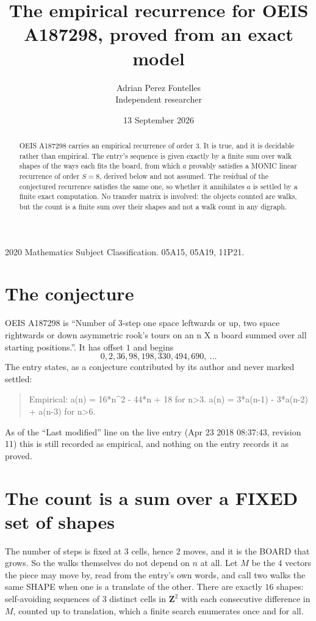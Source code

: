 \documentclass[11pt,a4paper]{article}
\title{The empirical recurrence for OEIS A187298, proved from an exact model}
\author{Adrian Perez Fontelles\\ \small Independent researcher}
\date{13 September 2026}
\theoremstyle{plain}
\theoremstyle{definition}
\begin{document}
\maketitle

\begin{abstract}
OEIS A187298 carries an empirical recurrence of order $3$. It is true, and it is
decidable rather than empirical. The entry's sequence is given exactly by a finite sum over walk shapes of the ways each fits the board, from
which $a$ provably satisfies a MONIC linear recurrence of order $S=8$, derived below and not
assumed. The residual of the conjectured recurrence satisfies the same one, so whether it
annihilates $a$ is settled by a finite exact computation. No transfer matrix is involved: the objects counted are walks, but the count is a finite sum over their shapes and not a walk count in any digraph.
\end{abstract}

\noindent\small 2020 Mathematics Subject Classification. 05A15, 05A19, 11P21.\normalsize

\section{The conjecture}

OEIS A187298 is ``Number of 3-step one space leftwards or up, two space rightwards or down asymmetric rook's tours on an n X n board summed over all starting positions.''. It has offset $1$ and begins
\[
0, 2, 36, 98, 198, 330, 494, 690,\ \dots
\]
The entry states, as a conjecture contributed by its author and never marked settled:
\begin{quote}
Empirical: a(n) = 16*n\^{}2 - 44*n + 18 for n>3. a(n) = 3*a(n-1) - 3*a(n-2) + a(n-3) for n>6.
\end{quote}
As of the ``Last modified'' line on the live entry (Apr 23 2018 08:37:43, revision 11)
this is still recorded as empirical, and nothing on the entry records it as proved.

\section{The count is a sum over a FIXED set of shapes}

The number of steps is fixed at $3$ cells, hence $2$ moves, and it is the BOARD
that grows. So the walks themselves do not depend on $n$ at all. Let $M$ be the $4$
vectors the piece may move by, read from the entry's own words, and call two walks the same
SHAPE when one is a translate of the other. There are exactly $16$ shapes: self-avoiding
sequences of $3$ distinct cells in $\mathbf{Z}^{2}$ with each consecutive difference in
$M$, counted up to translation, which a finite search enumerates once and for all.
\end{document}

